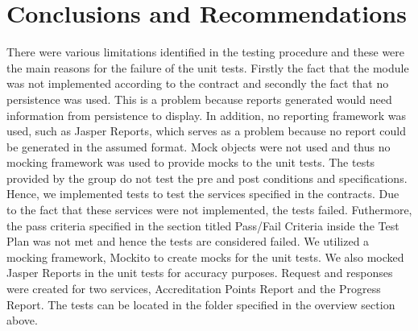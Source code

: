 \section{Conclusions and Recommendations}
\label{sec:conclusions}
There were various limitations identified in the testing procedure and these were the main reasons for the failure of the unit tests. Firstly the fact that the module was not implemented according to the contract and secondly the fact that no persistence was used. This is a problem because reports generated would need information from persistence to display. In addition, no reporting framework was used, such as Jasper Reports, which serves as a problem because no report could be generated in the assumed format. Mock objects were not used and thus no mocking framework was used to provide mocks to the unit tests. The tests provided by the group do not test the pre and post conditions and specifications. Hence, we implemented tests to test the services specified in the contracts. Due to the fact that these services were not implemented, the tests failed. Futhermore, the pass criteria specified in the section titled Pass/Fail Criteria inside the Test Plan was not met and hence the tests are considered failed. We utilized a mocking framework, Mockito to create mocks for the unit tests. We also mocked Jasper Reports in the unit tests for accuracy purposes. Request and responses were created for two services, Accreditation Points Report and the Progress Report. The tests can be located in the folder specified in the overview section above.

